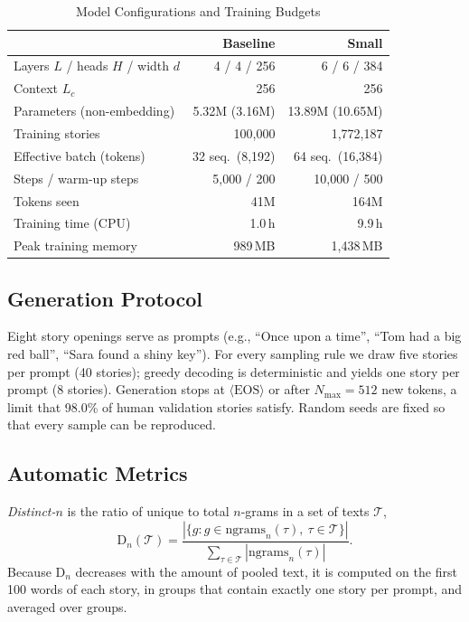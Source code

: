 \documentclass[journal]{IEEEtran}
\newcommand{\EOS}{\langle\mathrm{EOS}\rangle}
\begin{document}
\begin{table}[!t]
\centering
\caption{Model Configurations and Training Budgets}
\label{tab:models}
\begin{tabular}{@{}lrr@{}}
\toprule
 & Baseline & Small \\
\midrule
Layers $L$ / heads $H$ / width $d$ & 4 / 4 / 256 & 6 / 6 / 384 \\
Context $L_c$ & 256 & 256 \\
Parameters (non-embedding) & 5.32M (3.16M) & 13.89M (10.65M) \\
Training stories & 100,000 & 1,772,187 \\
Effective batch (tokens) & 32 seq.\ (8,192) & 64 seq.\ (16,384) \\
Steps / warm-up steps & 5,000 / 200 & 10,000 / 500 \\
Tokens seen & 41M & 164M \\
Training time (CPU) & 1.0\,h & 9.9\,h \\
Peak training memory & 989\,MB & 1,438\,MB \\
\bottomrule
\end{tabular}
\end{table}

\subsection{Generation Protocol}
Eight story openings serve as prompts (e.g., ``Once upon a time'', ``Tom had a big red ball'', ``Sara found a shiny key''). For every sampling rule we draw five stories per prompt (40 stories); greedy decoding is deterministic and yields one story per prompt (8 stories). Generation stops at $\EOS$ or after $N_{\max}=512$ new tokens, a limit that 98.0\% of human validation stories satisfy. Random seeds are fixed so that every sample can be reproduced.

\subsection{Automatic Metrics}
\emph{Distinct-$n$} \cite{li2016diversity} is the ratio of unique to total $n$-grams in a set of texts $\mathcal{T}$,
\begin{equation}
\mathrm{D}_n(\mathcal{T}) = \frac{|\{g : g\in \mathrm{ngrams}_n(\tau),\ \tau\in\mathcal{T}\}|}{\sum_{\tau\in\mathcal{T}}|\mathrm{ngrams}_n(\tau)|}.
\end{equation}
Because $\mathrm{D}_n$ decreases with the amount of pooled text, it is computed on the first 100 words of each story, in groups that contain exactly one story per prompt, and averaged over groups.
\end{document}
